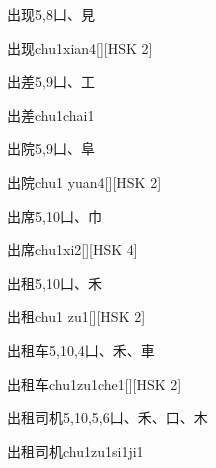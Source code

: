 \begin{entry}{出现}{5,8}{⼐、⾒}
  \begin{phonetics}{出现}{chu1xian4}[][HSK 2]
  \end{phonetics}
\end{entry}

\begin{entry}{出差}{5,9}{⼐、⼯}
  \begin{phonetics}{出差}{chu1chai1}
  \end{phonetics}
\end{entry}

\begin{entry}{出院}{5,9}{⼐、⾩}
  \begin{phonetics}{出院}{chu1 yuan4}[][HSK 2]
  \end{phonetics}
\end{entry}

\begin{entry}{出席}{5,10}{⼐、⼱}
  \begin{phonetics}{出席}{chu1xi2}[][HSK 4]
  \end{phonetics}
\end{entry}

\begin{entry}{出租}{5,10}{⼐、⽲}
  \begin{phonetics}{出租}{chu1 zu1}[][HSK 2]
  \end{phonetics}
\end{entry}

\begin{entry}{出租车}{5,10,4}{⼐、⽲、⾞}
  \begin{phonetics}{出租车}{chu1zu1che1}[][HSK 2]
  \end{phonetics}
\end{entry}

\begin{entry}{出租司机}{5,10,5,6}{⼐、⽲、⼝、⽊}
  \begin{phonetics}{出租司机}{chu1zu1si1ji1}
  \end{phonetics}
\end{entry}


